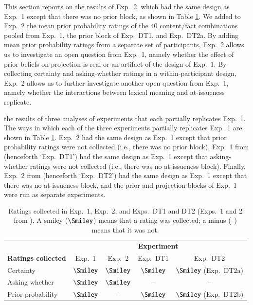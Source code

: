 \documentclass[11pt,fleqn]{article}
\newcommand{\6}{\mbox{$[\hspace*{-.6mm}[$}}
\newcommand{\9}{\mbox{$]\hspace*{-.6mm}]$}}
\begin{document}
This section reports on the results of Exp.~2, which had the same design as Exp.~1 except that there was no prior block, as shown in Table \ref{t:overview}. We added to Exp.~2 the mean prior probability ratings of the 40 content/fact combinations pooled from Exp.~1, the prior block of Exp.~DT1, and Exp.~DT2a. By adding mean prior probability ratings from a separate set of participants, Exp.~2 allows us to investigate an open question from Exp.~1, namely whether the effect of prior beliefs on projection is real or an artifact of the design of Exp.~1. By collecting certainty and asking-whether ratings in a within-participant design, Exp.~2 allows us to further investigate another open question from Exp.~1, namely whether the interactions between lexical meaning and at-issueness replicate. 



the results of three analyses of experiments that each partially replicates Exp.~1. The ways in which each of the three experiments partially replicates Exp.~1 are shown in Table \ref{t:overview}. Exp.~2 had the same design as Exp.~1 except that prior probability ratings were not collected (i.e., there was no prior block). Exp.~1 from \citealt{degen-tonhauser-openmind} (henceforth `Exp.~DT1') had the same design as Exp.~1 except that asking-whether ratings were not collected (i.e., there was no at-issueness block). Finally, Exp.~2 from \citealt{degen-tonhauser-openmind} (henceforth `Exp.~DT2') had the same design as Exp.~1 except that there was no at-issueness block, and the prior and projection blocks of Exp.~1 were run as separate experiments.

\begin{table}[h]
\centering
\begin{tabular}{l || c | c | c | c}
& \multicolumn{4}{c}{\bf Experiment} \\ 
{\bf Ratings collected} & Exp.~1 & Exp.~2 & Exp.~DT1 & Exp.~DT2 \\ \hline\hline

Certainty & $\Smiley$ & $\Smiley$ & $\Smiley$ & $\Smiley$ (Exp.~DT2a) \\

Asking whether & $\Smiley$ & $\Smiley$ & -- & -- \\

Prior probability & $\Smiley$ & -- & $\Smiley$ & $\Smiley$ (Exp.~DT2b) \\

\end{tabular}
\caption{Ratings collected in Exp.~1, Exp.~2, and Exps.~DT1 and DT2 (Exps.~1 and 2 from \citealt{degen-tonhauser-openmind}). A smiley ($\Smiley$) means that a rating was collected; a minus (--) means that it was not.}\label{t:overview}
\end{table}
\end{document}
